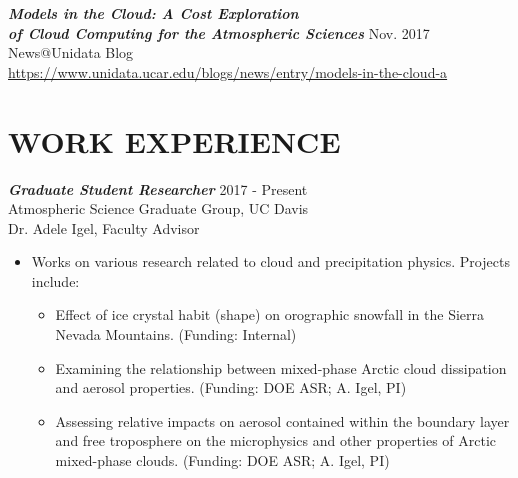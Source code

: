 \documentclass[overlapped]{res}
\begin{document}
\begin{resume}
    
                    
                    {\sl \textbf{Models in the Cloud: A Cost Exploration \\ of Cloud Computing for the Atmospheric Sciences}} \hfill Nov. 2017 \\
                    News@Unidata Blog \\
                    \href{https://www.unidata.ucar.edu/blogs/news/entry/models-in-the-cloud-a}{https://www.unidata.ucar.edu/blogs/news/entry/models-in-the-cloud-a}
    
    
\newpage
\section{WORK EXPERIENCE} 


                {\sl \textbf{Graduate Student Researcher}} \hfill 2017 - Present \\
                Atmospheric Science Graduate Group, UC Davis \\
                Dr. Adele Igel, Faculty Advisor \\
                \begin{itemize}
                    \item Works on various research related to cloud and precipitation physics. Projects include:
                    \begin{itemize} \itemsep -2pt
                        \item Effect of ice crystal habit (shape) on orographic snowfall in the Sierra Nevada Mountains. (Funding: Internal)
                        \item Examining the relationship between mixed-phase Arctic cloud dissipation and aerosol properties. (Funding: DOE ASR; A. Igel, PI) 
                        \item Assessing relative impacts on aerosol contained within the boundary layer and free troposphere on the microphysics and other properties of Arctic mixed-phase clouds. (Funding: DOE ASR; A. Igel, PI)
                    \end{itemize}
                \end{itemize}


\end{resume}
\end{document}
